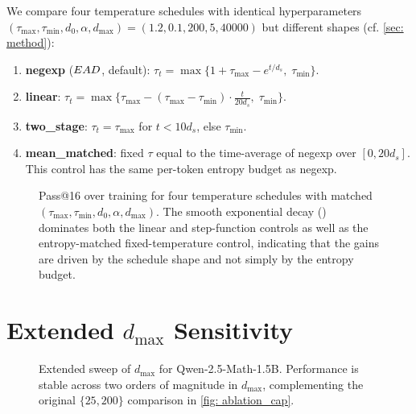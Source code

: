 {We compare four temperature schedules with identical hyperparameters
$(\tau_{\max},\tau_{\min},d_0,\alpha,d_{\max}) = (1.2, 0.1, 200, 5, 40000)$ but different shapes (cf. \cref{sec: method}):
\begin{enumerate}
\item \textbf{negexp} ($EAD$, default): $\tau_t = \max\{1 + \tau_{\max} - e^{t/d_s},\;\tau_{\min}\}$.
\item \textbf{linear}: $\tau_t = \max\{\tau_{\max} - (\tau_{\max}{-}\tau_{\min})\cdot\frac{t}{20 d_s},\;\tau_{\min}\}$.
\item \textbf{two\_stage}: $\tau_t = \tau_{\max}$ for $t < 10 d_s$, else $\tau_{\min}$.
\item \textbf{mean\_matched}: fixed $\tau$ equal to the time-average of negexp over $[0, 20 d_s]$. This control has the same per-token entropy budget as negexp.
\end{enumerate}

\begin{figure}[h!]
\centering
{}
\caption{Pass@16 over training for four temperature schedules with matched $(\tau_{\max},\tau_{\min},d_0,\alpha,d_{\max})$. The smooth exponential decay (\alg) dominates both the linear and step-function controls as well as the entropy-matched fixed-temperature control, indicating that the gains are driven by the schedule shape and not simply by the entropy budget.}
\label{fig:schedule_shapes}
\end{figure}

\section{Extended $d_{\max}$ Sensitivity}
\label{app:dmax_sensitivity}

\begin{figure}[h!]
\centering
{}
\caption{Extended sweep of $d_{\max}$ for Qwen-2.5-Math-1.5B. Performance is stable across two orders of magnitude in $d_{\max}$, complementing the original $\{25, 200\}$ comparison in \cref{fig: ablation_cap}.}
\label{fig: ablation_cap_extended}
\end{figure}

}
